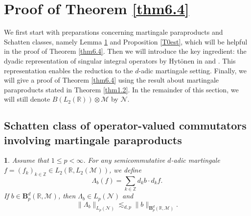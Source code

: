 \documentclass[oneside,english,a4wide]{amsart}
\numberwithin{equation}{section}
\numberwithin{figure}{section}
\theoremstyle{plain}
\theoremstyle{plain}
\theoremstyle{definition}
\theoremstyle{plain}
\newtheorem{lem}[thm]{\protect\lemmaname}
\theoremstyle{remark}
\theoremstyle{definition}
\theoremstyle{remark}
\theoremstyle{definition}
\providecommand{\lemmaname}{Lemma}
\newcommand{\8}{\infty}
\begin{document}
\bigskip


\section{Proof of Theorem \ref{thm6.4}}\label{Application 3}
We first start with preparations concerning martingale paraproducts and Schatten classes, namely Lemma \ref{TLambdab} and Proposition \ref{T0est}, which will be helpful in the proof of Theorem \ref{thm6.4}. Then we will introduce the key ingredient: the dyadic representation of singular integral operators by Hyt\"{o}nen in \cite{TH1} and \cite{TH2}. This representation enables the reduction to the $d$-adic martingale setting. Finally, we will give a proof of Theorem \ref{thm6.4} using the result about martingale paraproducts stated in Theorem \ref{thm1.2}. In the remainder of this section, we will still denote $B(L_2(\mathbb{R}))\otimes \mathcal{M}$ by $\mathcal{N}$.

\subsection{Schatten class of operator-valued commutators involving martingale paraproducts}
\begin{lem}\label{TLambdab}
	Assume that $1\le p<\infty$. For any semicommutative $d$-adic martingale $ f=(f_k)_{k\in\mathbb{Z} }\in L_2(\mathbb{R},L_2(\mathcal{M}))$, we define
	\[\varLambda_b(f)=\sum_{k\in\mathbb{Z}}d_kb\cdot d_kf.\]
	If $b\in\pmb{B}_p^d(\mathbb{R},\mathcal{M})$, then $\varLambda_b\in L_p(\mathcal{N})$ and 
	$$ \|\varLambda_b\|_{L_p(\mathcal{N})} \lesssim_{d, p} \|b\|_{\pmb{B}_p^d(\mathbb{R},\mathcal{M})}. $$
\end{lem}	
\end{document}
